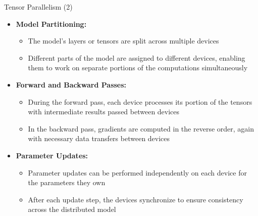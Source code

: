 \begin{vbframe}{Tensor Parallelism (2)}

\begin{itemize}
    \item \textbf{Model Partitioning:}
    \begin{itemize}
        \item The model's layers or tensors are split across multiple devices
        \item Different parts of the model are assigned to different devices, enabling them to work on separate portions of the computations simultaneously
    \end{itemize}
    
    \item \textbf{Forward and Backward Passes:}
    \begin{itemize}
        \item During the forward pass, each device processes its portion of the tensors with intermediate results passed between devices
        \item In the backward pass, gradients are computed in the reverse order, again with necessary data transfers between devices
    \end{itemize}    
    \item \textbf{Parameter Updates:}
    \begin{itemize}
        \item Parameter updates can be performed independently on each device for the parameters they own
        \item After each update step, the devices synchronize to ensure consistency across the distributed model
    \end{itemize}
\end{itemize}
    
\end{vbframe}





  
